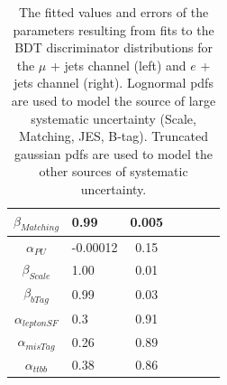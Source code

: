 \begin{table}[ht!]
\begin{tabular}{|c lc |c |c l p{1cm} |}
  \hline  
  $\beta_{Matching}$ & 0.99 &  0.005   \\  
  \hline  
  $\alpha_{PU}$    & -0.00012  & 0.15  \\
  \hline  
  $\beta_{Scale}$  & 1.00 & 0.01   \\ 
  \hline  
  $\beta_{bTag}$ & 0.99     & 0.03   \\
  \hline  
  $\alpha_{leptonSF}$ & 0.3 &0.91  \\   
  \hline  
  $\alpha_{misTag}$ & 0.26  & 0.89  \\
  \hline  
  $\alpha_{ttbb}$  & 0.38  & 0.86   \\
  \hline
\end{tabular}
\caption{The fitted values and errors of the parameters resulting from fits to the BDT discriminator distributions for the $\mu$ + jets channel (left) and $e$ + jets channel (right). Lognormal pdfs are used to model the source of large systematic uncertainty (Scale, Matching, JES, B-tag). Truncated gaussian pdfs are used to model the other sources of systematic uncertainty. }
\label{tab:fittedparams1}
\end{table}



